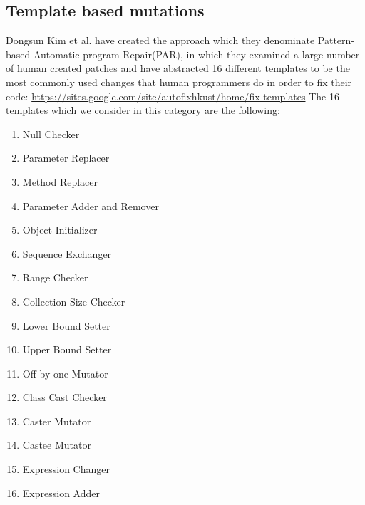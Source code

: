 \documentclass[conference]{IEEEtran}
\begin{document}
{{\subsection{Template based mutations}
Dongsun Kim et al. have created the approach which they denominate Pattern-based Automatic program Repair(PAR), in which they examined a large number of human created patches and have abstracted 16 different templates to be the most commonly used changes that human programmers do in order to fix their code: \url{https://sites.google.com/site/autofixhkust/home/fix-templates}
The 16 templates which we consider in this category are the following:
\begin{enumerate}
\item Null Checker
\item Parameter Replacer
\item Method Replacer
\item Parameter Adder and Remover
\item Object Initializer
\item Sequence Exchanger
\item Range Checker
\item Collection Size Checker
\item Lower Bound Setter
\item Upper Bound Setter
\item Off-by-one Mutator
\item Class Cast Checker
\item Caster Mutator
\item Castee Mutator
\item Expression Changer
\item Expression Adder
\end{enumerate}

}}
\end{document}
